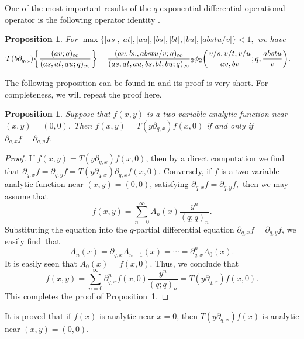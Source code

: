 \documentclass[pdftex]{sigma}
\numberwithin{equation}{section}
\newtheorem{Proposition}[Theorem]{Proposition}
 { \theoremstyle{definition}
\newtheorem{Definition}[Theorem]{Definition}
\newtheorem{Note}[Theorem]{Note}
\newtheorem{Example}[Theorem]{Example}
\newtheorem{Remark}[Theorem]{Remark} }
\begin{document}
One of the most important results of the $q$-exponential differential operational operator is the following operator identity \cite[equation~(3.1)]{Liu2010}.
\begin{Proposition}\label{liuopeppb}For $\max\{|as|, |at|, |au|, |bs|, |bt|, |bu|, |abstu/v|\}<1, $	we have
	\begin{align*}
		&T(b \partial_{q, a})\biggl\{\frac{(av; q)_\infty}{(as, at, au; q)_\infty}\biggr\}
=\frac{(av, bv, abstu/v; q)_\infty}{(as, at, au, bs, bt, bu; q)_\infty}
 {_3\phi_2}\biggl({{v/s, v/t, v/u}\atop{av, bv}}; q, \frac{abstu}{v}\biggr).
	\end{align*}
\end{Proposition}
The following proposition can be found in \cite[Lemma~13.2]{LiuRam2013} and its proof is very short. For completeness, we will repeat the proof here.
\begin{Proposition}\label{liulemope} Suppose that $f(x, y)$ is a two-variable analytic function near $(x, y)=(0, 0).$
	Then
	$f(x, y)=T(y \partial_{q, x})f(x, 0)$ if and only if $\partial_{q, x}f=\partial_{q, y}f$.
\end{Proposition}

\begin{proof}
	If $f(x, y)=T(y \partial_{q, x})f(x, 0)$, then by a direct computation we find that
	$\partial_{q, x}f=\partial_{q, y}f=T(y \partial_{q, x})\partial_{q, x}f(x, 0).$
	Conversely, if $f$ is a two-variable analytic function near $(x, y)=(0, 0)$, satisfying
	$\partial_{q, x}f=\partial_{q, y}f,$ then we may assume that
	\[
	f(x, y)=\sum_{n=0}^\infty A_n(x) \frac{y^n}{(q; q)_n}.
	\]
	Substituting the equation into the $q$-partial differential equation
	$\partial_{q, x}f=\partial_{q, y}f$, we easily find~that
	\[
	A_n(x)=\partial_{q, x}A_{n-1}(x)=\cdots=\partial^n_{q, x}A_0(x).
	\]
	It is easily seen that $A_0(x)=f(x, 0).$ Thus, we conclude that
	\[
	f(x, y)=\sum_{n=0}^\infty \partial^n_{q, x}f(x, 0)
	\frac{y^n}{(q; q)_n}
	=T(y \partial_{q, x})f(x, 0).
	\]
	This completes the proof of Proposition~\ref{liulemope}.
\end{proof}

It is proved \cite[Proposition~13.4]{LiuRam2013} that if $f(x)$ is analytic near $x=0$, then $T(y \partial_{q, x})f(x)$ is analytic near $(x, y)=(0, 0)$.
\end{document}
